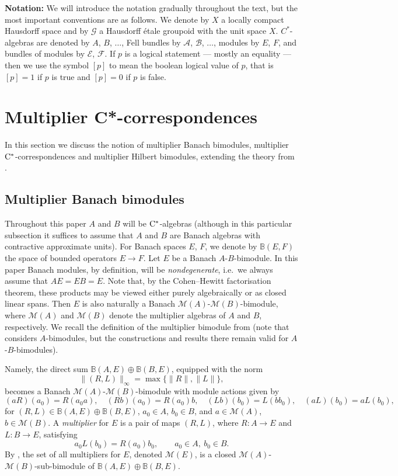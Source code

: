 \documentclass[11 pt, leqno]{amsart}
\numberwithin{equation}{section}
\theoremstyle{plain}
\theoremstyle{definition}
\newcommand*{\Cst}{\mathrm \cst}%
\newcommand{\B}{\mathcal B}
\newcommand{\BB}{\mathbb B}
\newcommand{\M}{\mathcal M}
\newcommand{\G}{\mathcal G} %
\newcommand{\EE}{\mathcal E}
\newcommand{\FF}{\mathcal F}
\newcommand{\A}{\mathcal A}
\newcommand{\cst}{\ifmmode\mathrm{C}^*\else{$\mathrm{C}^*$}\fi}
\begin{document}
\vspace*{0.3cm}

\textbf{Notation:} We will introduce the notation gradually throughout the text, but the most important conventions are as follows. 
We denote by $X$ a locally compact Hausdorff space and by $\G$ a Hausdorff \'etale groupoid with the unit space $X$. 
$C^*$-algebras are denoted by $A$, $B$, $\dots$, Fell bundles by $\A$, $\B$,  $\dots$, modules by $E$, $F$, and bundles of modules by $\EE$, $\FF$. 
If $p$ is a logical statement --- mostly an equality --- then we use the symbol $[p]$ to mean the boolean logical value of $p$, that is $[p]=1$ if $p$ is true and $[p]=0$ if $p$ is false. 



%
%
\section{Multiplier C*-correspondences} 
\label{sec:multiplier}

In this section we discuss the notion of multiplier Banach bimodules, multiplier $\cst$-correspondences and multiplier Hilbert bimodules, extending the theory from \cite{Daws}. 


%
\subsection{Multiplier Banach bimodules}

Throughout this paper $A$ and $B$ will be $\Cst$-algebras 
(although in this particular subsection it suffices to assume that $A$ and $B$ are Banach algebras with contractive approximate units).
For Banach spaces $E$, $F$, we denote by $\BB(E,F)$ the space of bounded operators $E\to F$.
Let $E$ be a Banach $A$-$B$-bimodule. 
In this paper Banach modules, by definition, will be \emph{nondegenerate}, 
i.e.\ we always assume that $AE = EB = E$. 
Note that, by the Cohen--Hewitt factorisation theorem, these products may be viewed either purely algebraically or as closed linear spans. 
Then $E$ is also naturally a Banach $\M(A)$-$\M(B)$-bimodule, 
where $\M(A)$ and $\M(B)$ denote the multiplier algebras of $A$ and $B$, respectively.
We recall the definition of the multiplier bimodule from \cite{Daws} 
(note that \cite{Daws} considers $A$-bimodules, but the constructions and results there remain valid for $A$-$B$-bimodules). 

Namely, the direct sum $\BB(A,E)\oplus\BB(B,E)$, equipped with the norm 
$$\|(R,L)\|_{\infty} = \max\{\|R\|,\|L\|\},
$$
becomes a Banach $\M(A)$-$\M(B)$-bimodule 
with module actions given by
\[
    (aR)(a_0) = R(a_0 a), \quad (Rb)(a_0) = R(a_0)b, \quad 
    (Lb)(b_0) = L(bb_0), \quad (aL)(b_0) = aL(b_0),
\]
for $(R,L)\in \BB(A,E)\oplus\BB(B,E)$, $a_0\in A$, $b_0\in B$, and $a\in\M(A)$, $b\in\M(B)$.
A \emph{multiplier} for $E$ is a pair of maps $(R,L)$, where $R:A\to E$ and $L:B\to E$, satisfying
\[
    a_0 L(b_0) = R(a_0)b_0, \qquad a_0\in A,\ b_0\in B.
\]
By \cite[Proposition~2.5]{Daws}, the set of all multipliers for $E$, denoted $\M(E)$, 
is a closed $\M(A)$-$\M(B)$-sub-bimodule of $\BB(A,E)\oplus\BB(B,E)$. 
\end{document}
